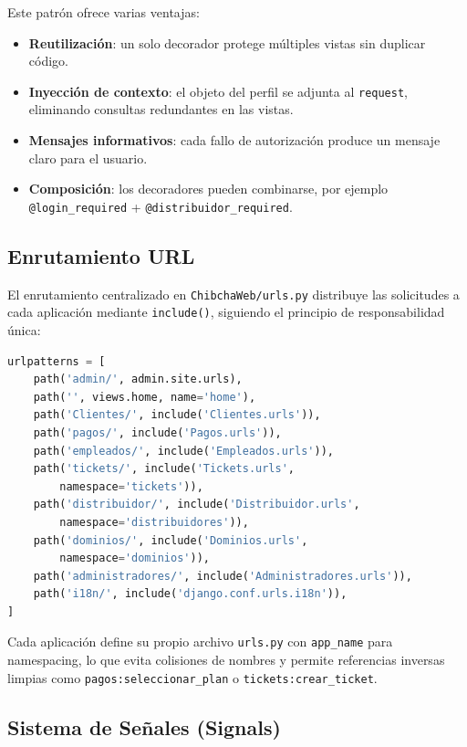 \documentclass[12pt, a4paper]{article}
\begin{document}
Este patrón ofrece varias ventajas:
\begin{itemize}
    \item \textbf{Reutilización}: un solo decorador protege múltiples vistas sin duplicar código.
    \item \textbf{Inyección de contexto}: el objeto del perfil se adjunta al \texttt{request}, eliminando consultas redundantes en las vistas.
    \item \textbf{Mensajes informativos}: cada fallo de autorización produce un mensaje claro para el usuario.
    \item \textbf{Composición}: los decoradores pueden combinarse, por ejemplo \texttt{@login\_required} + \texttt{@distribuidor\_required}.
\end{itemize}

\subsection{Enrutamiento URL}
\label{subsec:urls}

El enrutamiento centralizado en \texttt{ChibchaWeb/urls.py} distribuye las solicitudes a cada aplicación mediante \texttt{include()}, siguiendo el principio de responsabilidad única:

\begin{lstlisting}[language=Python, caption={Enrutamiento principal (ChibchaWeb/urls.py)}]
urlpatterns = [
    path('admin/', admin.site.urls),
    path('', views.home, name='home'),
    path('Clientes/', include('Clientes.urls')),
    path('pagos/', include('Pagos.urls')),
    path('empleados/', include('Empleados.urls')),
    path('tickets/', include('Tickets.urls',
        namespace='tickets')),
    path('distribuidor/', include('Distribuidor.urls',
        namespace='distribuidores')),
    path('dominios/', include('Dominios.urls',
        namespace='dominios')),
    path('administradores/', include('Administradores.urls')),
    path('i18n/', include('django.conf.urls.i18n')),
]
\end{lstlisting}

Cada aplicación define su propio archivo \texttt{urls.py} con \texttt{app\_name} para namespacing, lo que evita colisiones de nombres y permite referencias inversas limpias como \texttt{pagos:seleccionar\_plan} o \texttt{tickets:crear\_ticket}.

\subsection{Sistema de Señales (Signals)}
\label{subsec:signals}
\end{document}
